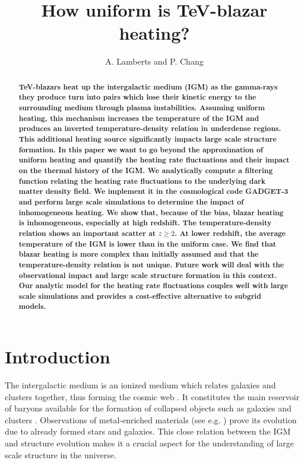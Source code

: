 \documentclass[twocolumns]{emulateapj}
\newcommand\ALc[1]{{\color{red} \bf #1}} %
\begin{document}
\title{How uniform is TeV-blazar heating?}

\author{A. Lamberts and P. Chang}


\begin{abstract}
\ALc{TeV-blazars heat up the intergalactic medium (IGM) as the gamma-rays they produce turn into pairs which lose their kinetic energy to the surrounding medium through plasma instabilities.  Assuming uniform heating, this mechanism increases the temperature of the IGM and produces an inverted temperature-density relation in underdense regions. This additional heating source significantly impacts large scale structure formation. In this paper we want  to go beyond the approximation of uniform heating and quantify the heating rate fluctuations and their impact on the thermal history of the IGM. We analytically compute a filtering function relating the heating rate fluctuations to the underlying  dark matter density field. We implement it in the cosmological code GADGET-3 and perform large scale simulations to determine the impact of inhomogeneous heating. We show that, because of the bias, blazar heating is inhomogeneous, especially at high redshift. The temperature-density relation shows an important scatter at $z\geqslant 2$. At lower redshift, the average temperature of the IGM is lower than in the uniform case. We find that blazar heating is more complex than initially assumed and that the temperature-density relation is not unique. Future work will deal with the observational impact and large scale structure formation in this context.  Our analytic model for the heating rate fluctuations couples well with large scale simulations and provides a cost-effective alternative to subgrid models.}
\end{abstract}

\section{Introduction}
The intergalactic medium is an ionized medium which relates galaxies and clusters together, thus forming the cosmic web \citep{1996Natur.380..603B}. It constitutes the main reservoir of baryons available for the formation of collapsed objects such as galaxies and clusters \citep{1997ApJ...489....7R}. Observations of metal-enriched materials (see e.g. \citet{2009A&A...493..409S,2010MNRAS.407.2063W}) prove its evolution due to already formed stars and galaxies. This close relation between the IGM and structure evolution makes it a  crucial aspect for the understanding of large scale structure in the universe.
\end{document}
